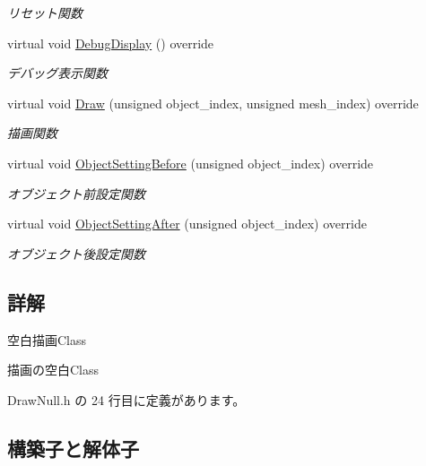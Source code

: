 \begin{DoxyCompactItemize}
\begin{DoxyCompactList}\small\item\em リセット関数 \end{DoxyCompactList}\item 
virtual void \mbox{\hyperlink{class_draw_null_aed3bbedfe8db8daf7cafa143750f2114}{Debug\+Display}} () override
\begin{DoxyCompactList}\small\item\em デバッグ表示関数 \end{DoxyCompactList}\item 
virtual void \mbox{\hyperlink{class_draw_null_a72ac0b7dc40b1469582419dcc5b0e114}{Draw}} (unsigned object\+\_\+index, unsigned mesh\+\_\+index) override
\begin{DoxyCompactList}\small\item\em 描画関数 \end{DoxyCompactList}\item 
virtual void \mbox{\hyperlink{class_draw_null_ac79a0adfc83537d5e677851463bb3028}{Object\+Setting\+Before}} (unsigned object\+\_\+index) override
\begin{DoxyCompactList}\small\item\em オブジェクト前設定関数 \end{DoxyCompactList}\item 
virtual void \mbox{\hyperlink{class_draw_null_a5b4466ae238e46cffe4a10fd253caf17}{Object\+Setting\+After}} (unsigned object\+\_\+index) override
\begin{DoxyCompactList}\small\item\em オブジェクト後設定関数 \end{DoxyCompactList}\end{DoxyCompactItemize}


\subsection{詳解}
空白描画\+Class 

描画の空白\+Class 

 Draw\+Null.\+h の 24 行目に定義があります。



\subsection{構築子と解体子}
\mbox{\label{class_draw_null_af03c2d730ff3351baf234f89cc28303b}} 
